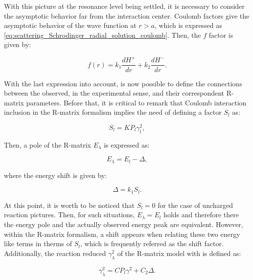\documentclass[openany]{book}
\begin{document}
With this picture at the resonance level being settled, it is necessary to consider the asymptotic behavior far from the interaction center. Coulomb factors give the asymptotic behavior of the wave function at $r > a$, which is expressed as \ref{eq:scattering_Schrodinger_radial_solution_coulomb}. Then, the $f$ factor is given by: 

\begin{equation}   \label{eq:rmatrix_f_Coulomb}
	f(r) = k_1\frac{dH^{+}}{dr}  + k_2 \frac{dH^{-}}{dr}.
\end{equation}

With the last expression into account, is now possible to define the connections between the observed, in the experimental sense, and their correspondent R-matrix parameters. Before that, it is critical to remark that Coulomb interaction inclusion in the R-matrix formalism implies the need of defining a factor $S_l$ as:

\begin{equation}   \label{eq:rmatrix_shiftFactor}
	S_l= K P_l\gamma^2_l,
\end{equation}

Then, a pole of the R-matrix $E_\lambda$ is expressed as: 

\begin{equation}  \label{eq:rmatrix_energyPole}
	E_\lambda =  E_l - \Delta, 
\end{equation}

where the energy shift is given by: 

\begin{equation}  \label{eq:rmatrix_energyShift}
	\Delta = k_1 S_l.
\end{equation}

At this point, it is worth to be noticed that $S_l = 0$ for the case of uncharged reaction pictures. Then, for such situations, $E_\lambda = E_l$ holds and therefore there the energy pole and the actually observed energy peak are equivalent. However, within the R-matrix formalism, a shift appears when relating these two energy like terms in therms of $S_l$, which is frequently referred as the shift factor. \\

Additionally, the reaction reduced $\gamma^2_\lambda$ of the R-matrix model  with is defined as:

\begin{equation}   \label{eq:rmatrix_reducedWidth_formal}
	\gamma^2_\lambda =C P_l\gamma^2 + C_2 \Delta.
\end{equation}
\end{document}
